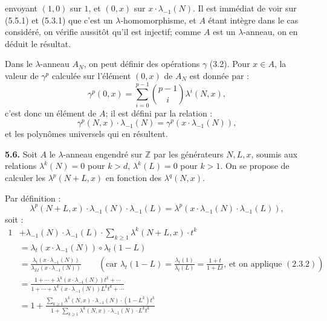 envoyant \((1,0)\) sur \(1\), et \((0,x)\) sur \(x\cdot\lambda_{-1}(N)\). Il est immédiat de voir sur (5.5.1) et (5.3.1) que c'est un \(\lambda\)-homomorphisme, et \(A\) étant intègre dans le cas considéré, on vérifie aussitôt qu'il est injectif; comme \(A\) est un \(\lambda\)-anneau, on en déduit le résultat.

Dans le \(\lambda\)-anneau \(A_N\), on peut définir des opérations \(\gamma\) (3.2). Pour \(x\in A\), la valeur de \(\gamma^p\) calculée sur l'élément \((0,x)\) de \(A_N\) est donnée par :
\[
  \gamma^p(0,x)=\sum_{i=0}^{p-1}\binom{p-1}{i}\lambda^i(N,x),
\]
c'est donc un élément de \(A\); il est défini par la relation :
\begin{equation}\tag{5.5.4}
  \gamma^p(N,x)\cdot\lambda_{-1}(N)=\gamma^p(x\cdot\lambda_{-1}(N)),
\end{equation}
et les polynômes universels qui en résultent.


\textbf{5.6.} Soit \(A\) le \(\lambda\)-anneau engendré sur \(\mathbb Z\) par les générateurs \(N,L,x\), soumis aux relations \(\lambda^k(N)=0\) pour \(k>d\), \(\lambda^k(L)=0\) pour \(k>1\). On se propose de calculer les \(\lambda^p(N+L,x)\) en fonction des \(\lambda^q(N,x)\).

Par définition :
\[
  \lambda^p(N+L,x)\cdot\lambda_{-1}(N)\cdot\lambda_{-1}(L)
  =\lambda^p(x\cdot\lambda_{-1}(N)\cdot\lambda_{-1}(L)),
\]
soit :
\[
\begin{aligned}
1&+\lambda_{-1}(N)\cdot\lambda_{-1}(L)\cdot\sum_{k\ge1}\lambda^k(N+L,x)\cdot t^k \\
 &=\lambda_t(x\cdot\lambda_{-1}(N))\circ \lambda_t(1-L) \\
 &=\frac{\lambda_t(x\cdot\lambda_{-1}(N))}{\lambda_{Lt}(x\cdot\lambda_{-1}(N))}
   \qquad\left(\text{car }\lambda_t(1-L)=\frac{\lambda_t(1)}{\lambda_t(L)}=\frac{1+t}{1+Lt}\text{, et on applique }(2.3.2)\right) \\
 &=\frac{1+\cdots+\lambda^k(x\cdot\lambda_{-1}(N))t^k+\cdots}{1+\cdots+\lambda^k(x\cdot\lambda_{-1}(N))L^k t^k+\cdots} \\
 &=1+\frac{\sum_{k\ge1}\lambda^k(N,x)\cdot\lambda_{-1}(N)\cdot(1-L^k)t^k}{1+\sum_{k\ge1}\lambda^k(N,x)\cdot\lambda_{-1}(N)\cdot L^k t^k}
\end{aligned}
\]

